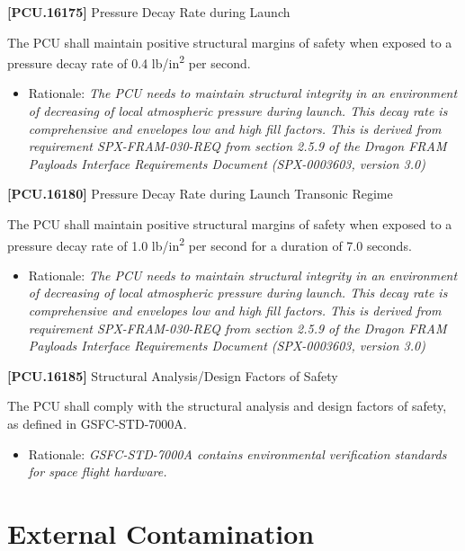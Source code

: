 \textbf{[PCU.16175]} Pressure Decay Rate during Launch

The \gls{PCU} shall maintain positive structural margins of safety when exposed to a pressure decay rate of 0.4 lb\slash in\textsuperscript{2} per second.

\begin{itemize}
\item{} Rationale: \emph{The PCU needs to maintain structural integrity in an environment of decreasing of local atmospheric pressure during launch. This decay rate is comprehensive and envelopes low and high fill factors. This is derived from requirement SPX-FRAM-030-REQ from section 2.5.9 of the Dragon FRAM Payloads Interface Requirements Document (SPX-0003603, version 3.0)}

\end{itemize}

\textbf{[PCU.16180]} Pressure Decay Rate during Launch Transonic Regime

The \gls{PCU} shall maintain positive structural margins of safety when exposed to a pressure decay rate of 1.0 lb\slash in\textsuperscript{2} per second for a duration of 7.0 seconds.

\begin{itemize}
\item{} Rationale: \emph{The PCU needs to maintain structural integrity in an environment of decreasing of local atmospheric pressure during launch. This decay rate is comprehensive and envelopes low and high fill factors. This is derived from requirement SPX-FRAM-030-REQ from section 2.5.9 of the Dragon FRAM Payloads Interface Requirements Document (SPX-0003603, version 3.0)}

\end{itemize}

\textbf{[PCU.16185]} Structural Analysis\slash Design Factors of Safety

The \gls{PCU} shall comply with the structural analysis and design factors of safety, as defined in \gls{GSFC}-STD-7000A.

\begin{itemize}
\item{} Rationale: \emph{GSFC-STD-7000A contains environmental verification standards for space flight hardware.}

\end{itemize}

\section{External Contamination}
\label{externalcontamination}

